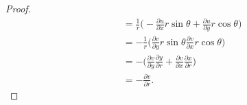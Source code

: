 \documentclass[11pt,a4paper]{book}
\begin{document}
\begin{enumerate}
\begin{proof}
\begin{align*}
                                                                    &= \frac{ 1 }{ r } \Big( - \frac{\partial u  }{\partial x   } r \sin \theta + \frac{\partial u }{\partial y } r \cos \theta   \Big) \\
                                                                    &= - \frac{ 1 }{ r } \Big(  \frac{\partial v }{\partial y }   r \sin \theta   \frac{\partial v  }{\partial x  }  r \cos \theta   \Big) \\
                                                                    &= - \Big(  \frac{\partial v }{\partial y }  \frac{\partial y }{\partial r  }  + \frac{\partial v }{\partial x }  \frac{\partial x }{\partial r  }  \Big)  \\
                                                                    &=  - \frac{\partial v }{\partial r }.
        \end{align*}


\end{proof}
\end{enumerate}
\end{document}
